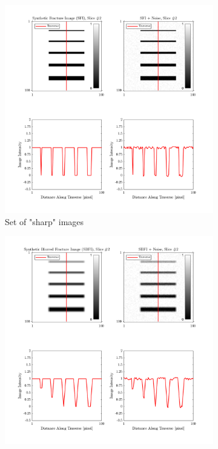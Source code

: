 \documentclass[usletter, 11pt, titlepage]{article}
\begin{document}
\begin{figure}[!h]
\centering
    \begin{subfigure}[b]{0.5\textwidth}            
            \includegraphics[width=\textwidth]{3DSyntheticFractureImages.png}
            \caption{Set of "sharp" images}
            \label{fig:Sharp images}
    \end{subfigure}%
    \begin{subfigure}[b]{0.5\textwidth}
            \centering
            \includegraphics[width=\textwidth]{3DSyntheticBlurredFractureImages.png}

\end{subfigure}
\end{figure}
\end{document}
